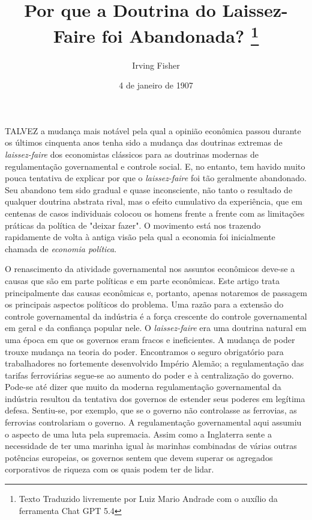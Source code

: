 \documentclass[12pt]{article}
\title{Por que a Doutrina do Laissez-Faire foi Abandonada? \thanks{Texto Traduzido livremente por Luiz Mario Andrade com o auxílio da ferramenta Chat GPT 5.4}}
\author{Irving Fisher}
\date{4 de janeiro de 1907}
\begin{document}
\maketitle

TALVEZ a mudança mais notável pela qual a opinião econômica passou durante os últimos cinquenta anos tenha sido a mudança das doutrinas extremas de \textit{laissez-faire} dos economistas clássicos para as doutrinas modernas de regulamentação governamental e controle social. E, no entanto, tem havido muito pouca tentativa de explicar por que o \textit{laissez-faire} foi tão geralmente abandonado. Seu abandono tem sido gradual e quase inconsciente, não tanto o resultado de qualquer doutrina abstrata rival, mas o efeito cumulativo da experiência, que em centenas de casos individuais colocou os homens frente a frente com as limitações práticas da política de "deixar fazer". O movimento está nos trazendo rapidamente de volta à antiga visão pela qual a economia foi inicialmente chamada de \textit{economia política}.

O renascimento da atividade governamental nos assuntos econômicos deve-se a causas que são em parte políticas e em parte econômicas. Este artigo trata principalmente das causas econômicas e, portanto, apenas notaremos de passagem os principais aspectos políticos do problema. Uma razão para a extensão do controle governamental da indústria é a força crescente do controle governamental em geral e da confiança popular nele. O \textit{laissez-faire} era uma doutrina natural em uma época em que os governos eram fracos e ineficientes. A mudança de poder trouxe mudança na teoria do poder. Encontramos o seguro obrigatório para trabalhadores no fortemente desenvolvido Império Alemão; a regulamentação das tarifas ferroviárias segue-se ao aumento do poder e à centralização do governo. Pode-se até dizer que muito da moderna regulamentação governamental da indústria resultou da tentativa dos governos de estender seus poderes em legítima defesa. Sentiu-se, por exemplo, que se o governo não controlasse as ferrovias, as ferrovias controlariam o governo. A regulamentação governamental aqui assumiu o aspecto de uma luta pela supremacia. Assim como a Inglaterra sente a necessidade de ter uma marinha igual às marinhas combinadas de várias outras potências europeias, os governos sentem que devem superar os agregados corporativos de riqueza com os quais podem ter de lidar.
\end{document}
